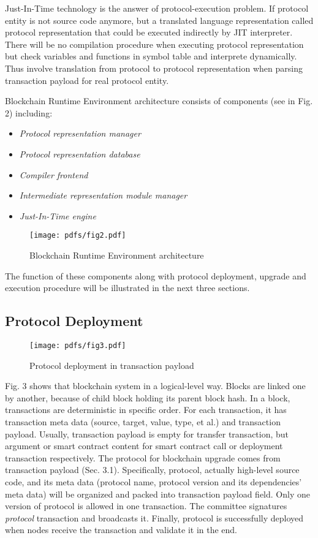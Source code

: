 \documentclass[sigplan,screen]{acmart}
\begin{document}
\begin{itemize}
    Just-In-Time technology is the answer of protocol-execution problem. If
    protocol entity is not source code anymore, but a translated language
    representation called protocol representation that could be executed
    indirectly by JIT interpreter. There will be no compilation procedure when
    executing protocol representation but check variables and functions in
    symbol table and interprete dynamically. Thus involve translation from
    protocol to protocol representation when parsing transaction payload for
    real protocol entity.
\end{itemize}

Blockchain Runtime Environment architecture consists of components (see in Fig.
2) including:
\begin{itemize}
  \item \textit{Protocol representation manager}
  \item \textit{Protocol representation database}
  \item \textit{Compiler frontend}
  \item \textit{Intermediate representation module manager}
  \item \textit{Just-In-Time engine}
\end{itemize}

\begin{figure}
  \texttt{[image: pdfs/fig2.pdf]}
  \caption{Blockchain Runtime Environment architecture}
\end{figure}

The function of these components along with protocol deployment, upgrade and
execution procedure will be illustrated in the next three sections.

\subsection{Protocol Deployment}

\begin{figure}
  \texttt{[image: pdfs/fig3.pdf]}
  \caption{Protocol deployment in transaction payload}
\end{figure}

Fig. 3 shows that blockchain system in a logical-level way. Blocks are linked
one by another, because of child block holding its parent block hash. In a
block, transactions are deterministic in specific order. For each transaction,
it has transaction meta data (source, target, value, type, et al.) and
transaction payload. Usually, transaction payload is empty for transfer
transaction, but argument or smart contract content for smart contract call
or deployment transaction respectively.
The protocol for blockchain upgrade comes from transaction payload
(Sec. 3.1). Specifically, protocol, actually high-level source
code, and its meta data (protocol name, protocol version and its dependencies'
meta data) will be organized and packed into transaction payload field.
Only one version of protocol is allowed in one transaction. The committee
signatures \textit{protocol} transaction and broadcasts it. Finally, protocol
is successfully deployed when nodes receive the transaction and validate it in
the end.
\end{document}
